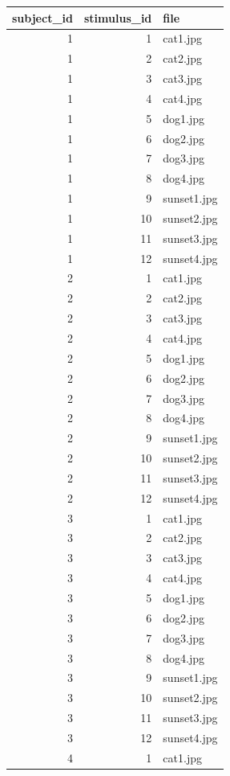 \documentclass[]{book}
\begin{document}
\begin{tabular}{r|r|l}
\hline
subject\_id & stimulus\_id & file\\
\hline
1 & 1 & cat1.jpg\\
\hline
1 & 2 & cat2.jpg\\
\hline
1 & 3 & cat3.jpg\\
\hline
1 & 4 & cat4.jpg\\
\hline
1 & 5 & dog1.jpg\\
\hline
1 & 6 & dog2.jpg\\
\hline
1 & 7 & dog3.jpg\\
\hline
1 & 8 & dog4.jpg\\
\hline
1 & 9 & sunset1.jpg\\
\hline
1 & 10 & sunset2.jpg\\
\hline
1 & 11 & sunset3.jpg\\
\hline
1 & 12 & sunset4.jpg\\
\hline
2 & 1 & cat1.jpg\\
\hline
2 & 2 & cat2.jpg\\
\hline
2 & 3 & cat3.jpg\\
\hline
2 & 4 & cat4.jpg\\
\hline
2 & 5 & dog1.jpg\\
\hline
2 & 6 & dog2.jpg\\
\hline
2 & 7 & dog3.jpg\\
\hline
2 & 8 & dog4.jpg\\
\hline
2 & 9 & sunset1.jpg\\
\hline
2 & 10 & sunset2.jpg\\
\hline
2 & 11 & sunset3.jpg\\
\hline
2 & 12 & sunset4.jpg\\
\hline
3 & 1 & cat1.jpg\\
\hline
3 & 2 & cat2.jpg\\
\hline
3 & 3 & cat3.jpg\\
\hline
3 & 4 & cat4.jpg\\
\hline
3 & 5 & dog1.jpg\\
\hline
3 & 6 & dog2.jpg\\
\hline
3 & 7 & dog3.jpg\\
\hline
3 & 8 & dog4.jpg\\
\hline
3 & 9 & sunset1.jpg\\
\hline
3 & 10 & sunset2.jpg\\
\hline
3 & 11 & sunset3.jpg\\
\hline
3 & 12 & sunset4.jpg\\
\hline
4 & 1 & cat1.jpg\\

\end{tabular}
\end{document}
